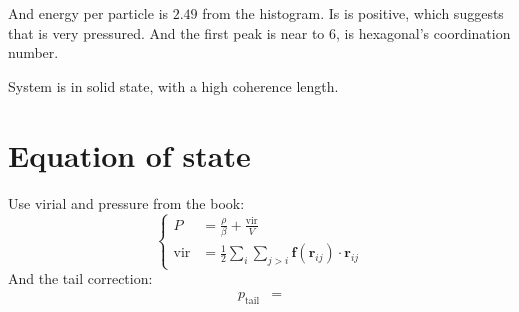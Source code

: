 \documentclass[UTF8,a4paper]{article}
\begin{document}
And energy per particle is $2.49$ from the histogram. Is is positive, which suggests that is very pressured. And the first peak is near to 6, is hexagonal's coordination number.

System is in solid state, with a high coherence length.
\section{Equation of state}
Use virial and pressure from the book:
\begin{equation}
	\left\{
		\begin{aligned}
			P&=\frac{\rho}{\beta}+\frac{\text{vir}}{V} \\
			\text{vir}&=\frac{1}{2} \sum_{i} \sum_{j>i} \mathbf{f}\left(\mathbf{r}_{i j}\right) \cdot \mathbf{r}_{i j}
		\end{aligned}
	\right.
\end{equation}
And the tail correction:
\begin{align}
	p_{\text{tail}} &= 
\end{align}
\end{document}
